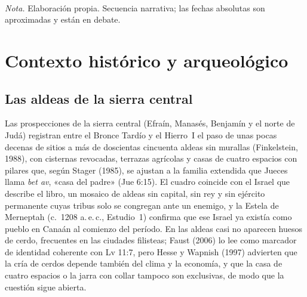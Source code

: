 \begin{center}
\\[2pt]
{\footnotesize\color{sepia}\textit{Nota.} Elaboración propia. Secuencia narrativa; las fechas absolutas son aproximadas y están en debate.}
\end{center}

\section{Contexto histórico y arqueológico}

\subsection{Las aldeas de la sierra central}
Las prospecciones de la sierra central (Efraín, Manasés, Benjamín y el norte de Judá) registran entre el Bronce Tardío y el Hierro~I el paso de unas pocas decenas de sitios a más de doscientas cincuenta aldeas sin murallas (Finkelstein, 1988), con cisternas revocadas, terrazas agrícolas y casas de cuatro espacios con pilares que, según Stager (1985), se ajustan a la familia extendida que Jueces llama \emph{bet av}, «casa del padre» (Jue 6:15). El cuadro coincide con el Israel que describe el libro, un mosaico de aldeas sin capital, sin rey y sin ejército permanente cuyas tribus solo se congregan ante un enemigo, y la Estela de Merneptah (c.~1208 a.\,e.\,c., Estudio~1) confirma que ese Israel ya existía como pueblo en Canaán al comienzo del período. En las aldeas casi no aparecen huesos de cerdo, frecuentes en las ciudades filisteas; Faust (2006) lo lee como marcador de identidad coherente con Lv 11:7, pero Hesse y Wapnish (1997) advierten que la cría de cerdos depende también del clima y la economía, y que la casa de cuatro espacios o la jarra con collar tampoco son exclusivas, de modo que la cuestión sigue abierta.

